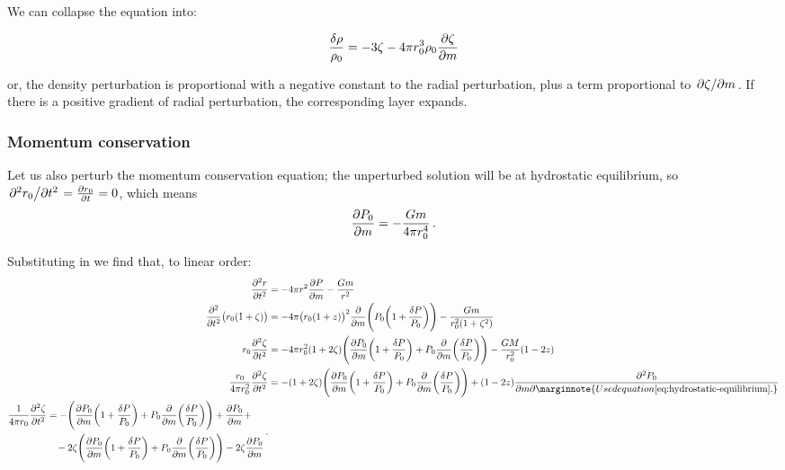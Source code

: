 \documentclass[main.tex]{subfiles}
\begin{document}
We can collapse the equation into:

\begin{equation}
  \frac{\delta \rho}{\rho_0} =
  - 3 \zeta - 4 \pi r_0^3 \rho_0 \pdv{\zeta}{m}
\end{equation}

or, the density perturbation is proportional with a negative constant to the radial perturbation, plus a term proportional to \(\pdv*{\zeta}{m}\).
If there is a positive gradient of radial perturbation, the corresponding layer expands.

\subsubsection{Momentum conservation}

Let us also perturb the momentum conservation equation; the unperturbed solution will be at hydrostatic equilibrium, so \(\pdv*[2]{r_0}{t} = \pdv{r_0 }{t} =0 \), which means 
%
\begin{align} \label{eq:hydrostatic-equilibrium}
\pdv{P_0 }{m} = - \frac{Gm}{4 \pi r_0^{4}}
\,.
\end{align}

Substituting in we find that, to linear order: 
%
\begin{align}
\pdv[2]{r}{t} &= - 4 \pi r^2 \pdv{P}{m} - \frac{Gm}{r^2} \\
\pdv[2]{}{t} \qty(r_0 \qty(1 + \zeta )) 
&= 
- 4 \pi \qty(r_0 (1+z))^2 \pdv{}{m} \qty(P_0 \qty(1 + \frac{ \delta P }{P_0 })) - \frac{Gm}{r_0^2 (1 + \zeta^2)} 
\\
r_0 \pdv[2]{\zeta }{t} 
&=
- 4 \pi r_0^2 \qty(1 + 2 \zeta )
\qty(\pdv{P_0 }{m} \qty(1 + \frac{ \delta P}{P_0 }) + P_0 \pdv{}{m} \qty(\frac{ \delta P}{P_0 }))
- \frac{GM}{r_0^2} \qty(1 - 2z) 
\\
\frac{r_0}{4 \pi r_0^2} \pdv[2]{\zeta }{t} &= - \qty(1 + 2 \zeta )
\qty(\pdv{P_0 }{m} \qty(1 + \frac{ \delta P}{P_0 }) + P_0 \pdv{}{m} \qty(\frac{ \delta P}{P_0 }))
+ \qty(1 - 2z) \pdv{P_0 }{m} \marginnote{Used equation \eqref{eq:hydrostatic-equilibrium}.} \\ 
\begin{split}
\frac{1}{4 \pi r_0} \pdv[2]{\zeta }{t} &= 
- \qty(\pdv{P_0 }{m} \qty(1 + \frac{ \delta P}{P_0 }) + P_0 \pdv{}{m} \qty(\frac{ \delta P}{P_0 })) + \pdv{P_0 }{m} + \\
&\phantom{=}\, - 2\zeta \qty(\pdv{P_0 }{m} \qty(1 + \frac{ \delta P}{P_0 }) + P_0 \pdv{}{m} \qty(\frac{ \delta P}{P_0 }))
- 2 \zeta \pdv{P_0 }{m}
\end{split}
\,.
\end{align}
%
\end{document}
